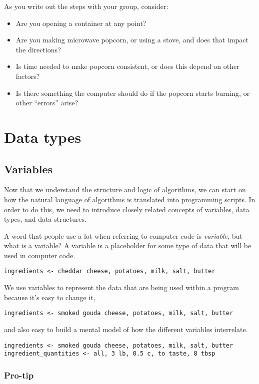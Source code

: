 \documentclass[
]{book}
\providecommand{\tightlist}{%
  \setlength{\itemsep}{0pt}\setlength{\parskip}{0pt}}
\begin{document}
As you write out the steps with your group, consider:

\begin{itemize}
\tightlist
\item
  Are you opening a container at any point?
\item
  Are you making microwave popcorn, or using a stove, and does that impact the directions?
\item
  Is time needed to make popcorn consistent, or does this depend on other factors?
\item
  Is there something the computer should do if the popcorn starts burning, or other ``errors'' arise?
\end{itemize}

\chapter{Data types}\label{data-types}

\section{Variables}\label{variables}

Now that we understand the structure and logic of algorithms, we can start on how the natural language of algorithms is translated into programming scripts. In order to do this, we need to introduce closely related concepts of variables, data types, and data structures.

A word that people use a lot when referring to computer code is \emph{variable}, but what is a variable? A variable is a placeholder for some type of data that will be used in computer code.

\texttt{ingredients\ \textless{}-\ cheddar\ cheese,\ potatoes,\ milk,\ salt,\ butter}

We use variables to represent the data that are being used within a program because it's easy to change it,

\texttt{ingredients\ \textless{}-\ smoked\ gouda\ cheese,\ potatoes,\ milk,\ salt,\ butter}

and also easy to build a mental model of how the different variables interrelate.

\begin{verbatim}
ingredients <- smoked gouda cheese, potatoes, milk, salt, butter
ingredient_quantities <- all, 3 lb, 0.5 c, to taste, 8 tbsp
\end{verbatim}

\subsection{Pro-tip}\label{pro-tip}
\end{document}
